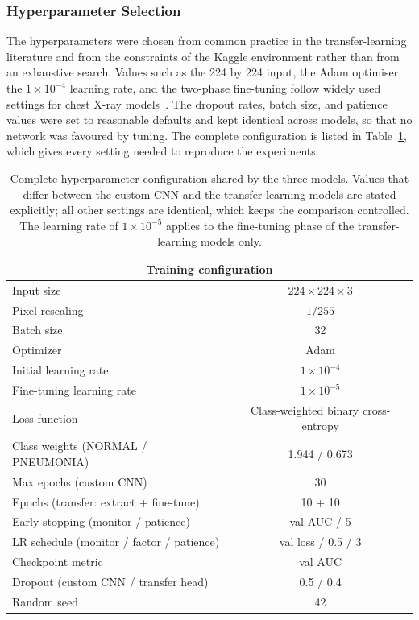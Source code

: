 \documentclass[preprint,12pt]{elsarticle}
\begin{document}
\subsubsection{Hyperparameter Selection}
The hyperparameters were chosen from common practice in the transfer-learning literature and from the constraints of the Kaggle environment rather than from an exhaustive search.
Values such as the 224 by 224 input, the Adam optimiser, the $1\times10^{-4}$ learning rate, and the two-phase fine-tuning follow widely used settings for chest X-ray models~\cite{rahman2020transfer,ranjan2022transfer}.
The dropout rates, batch size, and patience values were set to reasonable defaults and kept identical across models, so that no network was favoured by tuning.
The complete configuration is listed in Table~\ref{tab:hyperparams}, which gives every setting needed to reproduce the experiments.

\begin{table}[!ht]
\centering
\caption{Complete hyperparameter configuration shared by the three models. Values that differ between the custom CNN and the transfer-learning models are stated explicitly; all other settings are identical, which keeps the comparison controlled. The learning rate of $1\times10^{-5}$ applies to the fine-tuning phase of the transfer-learning models only.}
\label{tab:hyperparams}
\begin{tabular}{|l|c|}
\hline
\multicolumn{2}{|c|}{\textbf{Training configuration}} \\ \hline
Input size & $224\times224\times3$ \\
Pixel rescaling & $1/255$ \\
Batch size & 32 \\
Optimizer & Adam \\
Initial learning rate & $1\times10^{-4}$ \\
Fine-tuning learning rate & $1\times10^{-5}$ \\
Loss function & Class-weighted binary cross-entropy \\
Class weights (NORMAL / PNEUMONIA) & 1.944 / 0.673 \\
Max epochs (custom CNN) & 30 \\
Epochs (transfer: extract + fine-tune) & 10 + 10 \\
Early stopping (monitor / patience) & val AUC / 5 \\
LR schedule (monitor / factor / patience) & val loss / 0.5 / 3 \\
Checkpoint metric & val AUC \\
Dropout (custom CNN / transfer head) & 0.5 / 0.4 \\
Random seed & 42 \\ \hline
\end{tabular}
\end{table}
\end{document}
